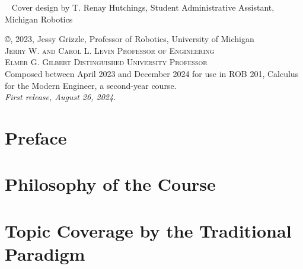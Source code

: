 \documentclass[letterpaper]{book}
\makeatletter
\renewcommand{\frontmatter}{\cleardoublepage\@mainmatterfalse}
\makeatother
\begin{document}
\begingroup
\thispagestyle{empty}


~\vfill
\thispagestyle{empty}
\noindent Cover design by T. Renay Hutchings, Student Administrative Assistant, Michigan Robotics

\vspace*{2cm}
\noindent\copyright{}, 2023, Jessy Grizzle,  Professor of Robotics, University of Michigan	\\
\noindent \textsc{Jerry W. and Carol L. Levin Professor of Engineering\\
Elmer G. Gilbert Distinguished University Professor}\\


\noindent Composed between April 2023 and December 2024 for use in ROB 201, Calculus for the Modern Engineer, a second-year course.
\\ %

\noindent \textit{First release, August 26, 2024.} %


\endgroup

\frontmatter
\tableofcontents
\chapter{Preface}

\chapter{Philosophy of the Course}

\chapter{Topic Coverage by the Traditional Paradigm}

\end{document}
